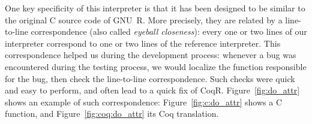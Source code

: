 \documentclass[
    sigplan,
    10pt,
    review, %
    natbib=false %
 ]{acmart}
\begin{document}
One key specificity of this interpreter is that it has been designed
to be similar to the original C source code of GNU~R.
More precisely, they are related by a line-to-line correspondence
(also called \emph{eyeball closeness}):
every one or two lines of our interpreter
correspond to one or two lines of the reference interpreter.
%
This correspondence helped us during the development process:
whenever a bug was encountered during the testing process,
we would localize the function responsible for the bug,
then check the line-to-line correspondence.
Such checks were quick and easy to perform,
and often lead to a quick fix of CoqR.
%
Figure~\ref{fig:do_attr} shows an example of such correspondence:
Figure~\ref{fig:c:do_attr} shows a C function,
and Figure~\ref{fig:coq:do_attr} its Coq translation.
\end{document}
